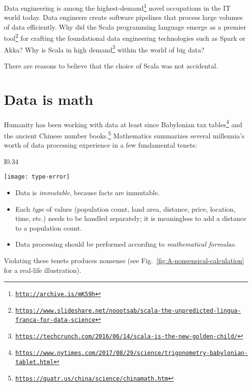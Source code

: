 Data engineering is among the highest-demand\footnote{\texttt{\href{http://archive.is/mK59h}{http://archive.is/mK59h}}}
novel occupations in the IT world today. Data engineers create software
pipelines that process large volumes of data efficiently. Why did
the Scala programming language emerge as a premier tool\footnote{\texttt{\href{https://www.slideshare.net/noootsab/scala-the-unpredicted-lingua-franca-for-data-science}{https://www.slideshare.net/noootsab/scala-the-unpredicted-lingua-franca-for-data-science}}}
for crafting the foundational data engineering technologies such as
Spark or Akka? Why is Scala in high demand\footnote{\texttt{\href{https://techcrunch.com/2016/06/14/scala-is-the-new-golden-child/}{https://techcrunch.com/2016/06/14/scala-is-the-new-golden-child/}}}
within the world of big data?

There are reasons to believe that the choice of Scala was not accidental.

\section{Data is math}

Humanity has been working with data at least since Babylonian tax
tables\footnote{\texttt{\href{https://www.nytimes.com/2017/08/29/science/trigonometry-babylonian-tablet.html}{https://www.nytimes.com/2017/08/29/science/trigonometry-babylonian-tablet.html}}}
and the ancient Chinese number books.\footnote{\texttt{\href{https://web.archive.org/web/20170425233550/https://quatr.us/china/science/chinamath.htm}{https://quatr.us/china/science/chinamath.htm}}}
Mathematics summarizes several millennia\textsf{'}s worth of data processing
experience in a few fundamental tenets:

\begin{wrapfigure}{I}{0.34\columnwidth}%
\begin{centering}
\vspace{-0.65\baselineskip}
\texttt{[image: type-error]}\vspace{-0.5\baselineskip}
\par\end{centering}
\caption{Mixing incompatible data types produces nonsensical
results.\label{fig:A-nonsensical-calculation}}

\vspace{-3.5\baselineskip}
\end{wrapfigure}%

\begin{itemize}
\item Data is \emph{immutable}, because facts are immutable. 
\item Each \emph{type} of values (population count, land area, distance,
price, location, time, etc.) needs to be handled separately; it is
meaningless to add a distance to a population count.
\item Data processing should be performed according to \emph{mathematical
formulas}. 
\end{itemize}
Violating these tenets produces nonsense (see Fig.\ \ref{fig:A-nonsensical-calculation}
for a real-life illustration).

